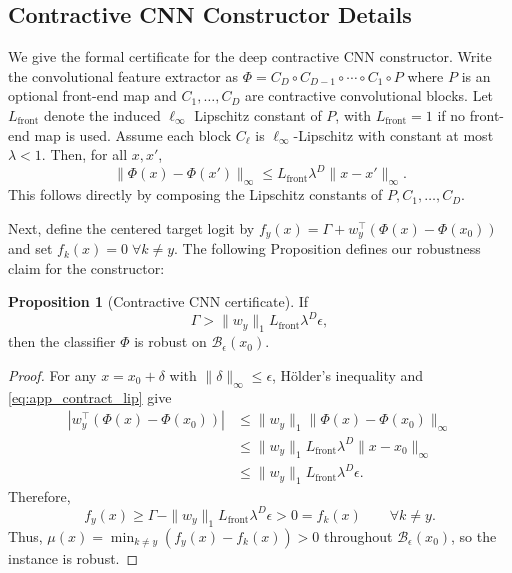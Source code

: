 \documentclass{article}
\theoremstyle{definition}
\newtheorem{proposition}[theorem]{Proposition}
\begin{document}
\subsection{Contractive CNN Constructor Details}
\label{app:contractive_cnn}

We give the formal certificate for the deep contractive CNN constructor. Write the convolutional feature extractor as $\Phi = C_D\circ C_{D-1}\circ\cdots\circ C_1\circ P$ where $P$ is an optional front-end map and $C_1,\dots,C_D$ are contractive convolutional blocks. Let $L_{\mathrm{front}}$ denote the induced $\ell_\infty$ Lipschitz constant of $P$, with $L_{\mathrm{front}}=1$ if no front-end map is used. Assume each block $C_\ell$ is $\ell_\infty$-Lipschitz with constant at most $\lambda<1$. Then, for all $x,x'$,
\begin{equation}
    \|\Phi(x)-\Phi(x')\|_\infty
    \leq
    L_{\mathrm{front}}\lambda^D\|x-x'\|_\infty.
    \label{eq:app_contract_lip}
\end{equation}
This follows directly by composing the Lipschitz constants of $P,C_1,\dots,C_D$. 

Next, define the centered target logit by $f_y(x) = \Gamma+w_y^\top(\Phi(x)-\Phi(x_0))$ and set $f_k(x) =0 \; \forall k\neq y$. The following Proposition defines our robustness claim for the constructor:

\begin{proposition}[Contractive CNN certificate]
If
\begin{equation}
    \Gamma>\|w_y\|_1L_{\mathrm{front}}\lambda^D\epsilon,
\end{equation}
then the classifier $\Phi$ is robust on $\mathcal B_\epsilon(x_0)$.
\end{proposition}

\begin{proof}
For any $x=x_0+\delta$ with $\|\delta\|_\infty\leq\epsilon$, H\"older's inequality and \eqref{eq:app_contract_lip} give
\begin{equation}
\begin{aligned}
    \left|w_y^\top(\Phi(x)-\Phi(x_0))\right|
    &\leq \|w_y\|_1\|\Phi(x)-\Phi(x_0)\|_\infty \\
    &\leq \|w_y\|_1L_{\mathrm{front}}\lambda^D\|x-x_0\|_\infty \\
    &\leq \|w_y\|_1L_{\mathrm{front}}\lambda^D\epsilon.
\end{aligned}
\label{eq:app_contract_drift}
\end{equation}
Therefore,
\begin{equation}
    f_y(x)
    \geq
    \Gamma-\|w_y\|_1L_{\mathrm{front}}\lambda^D\epsilon
    > 0
    = f_k(x) \qquad \forall k\neq y.
\end{equation}
Thus, $\mu(x)=\min_{k\neq y}(f_y(x)-f_k(x))>0$ throughout $\mathcal B_\epsilon(x_0)$, so the instance is robust.
\end{proof}
\end{document}
